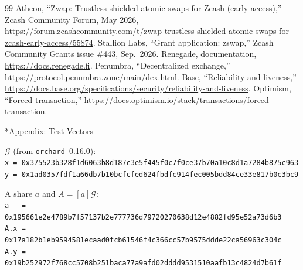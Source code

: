 \documentclass[10pt,letterpaper]{article}
\makeatletter
\renewcommand\section{\@startsection{section}{1}{\z@}{-1.3em}{0.45em}{\normalfont\large\bfseries}}
\theoremstyle{plain}
\theoremstyle{definition}
\newcommand{\Gor}{\mathcal{G}}
\newcommand{\fn}[1]{\texttt{#1}}
\makeatother
\begin{document}
\begin{thebibliography}{99}
 Atheon, ``Zwap: Trustless shielded atomic swaps for Zcash (early access),'' Zcash Community Forum, May 2026, \url{https://forum.zcashcommunity.com/t/zwap-trustless-shielded-atomic-swaps-for-zcash-early-access/55874}.
 Stallion Labs, ``Grant application: zswap,'' Zcash Community Grants issue \#443, Sep.\ 2026.
 Renegade, documentation, \url{https://docs.renegade.fi}.
 Penumbra, ``Decentralized exchange,'' \url{https://protocol.penumbra.zone/main/dex.html}.
 Base, ``Reliability and liveness,'' \url{https://docs.base.org/specifications/security/reliability-and-liveness}.
 Optimism, ``Forced transaction,'' \url{https://docs.optimism.io/stack/transactions/forced-transaction}.
\end{thebibliography}

\appendix
\section*{Appendix: Test Vectors}
{\small
$\Gor$ (from \fn{orchard}~0.16.0):\\
\texttt{x = 0x375523b328f1d6063b8d187c3e5f445f0c7f0ce37b70a10c8d1a7284b875c963}\\
\texttt{y = 0x1ad0357fdf1a66db7b10bcfcfed624fbdfc914fec005bdd84ce33e817b0c3bc9}

A share $a$ and $A = [a]\Gor$:\\
\texttt{a\ \ \ = 0x195661e2e4789b7f57137b2e777736d79720270638d12e4882fd95e52a73d6b3}\\
\texttt{A.x = 0x17a182b1eb9594581ecaad0fcb61546f4c366cc57b9575ddde22ca56963c304c}\\
\texttt{A.y = 0x19b252972f768cc5708b251baca77a9afd02dddd9531510aafb13c4824d7b61f}
}
\end{document}
